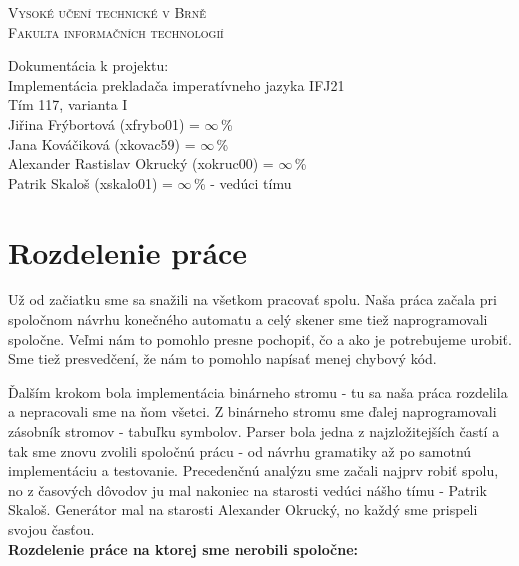 \documentclass[a4paper, 12pt]{article}
\begin{document}
\begin{titlepage}
\begin{center}
\thispagestyle{empty}
{\Huge
\textsc{Vysoké učení technické v Brně\\}}
{\LARGE
\textsc {Fakulta informačních technologií\\[0.4em]}}


{\LARGE Dokumentácia k projektu: \\[0.3em]}
{\LARGE Implementácia prekladača imperatívneho jazyka IFJ21}
{\LARGE \\Tím 117, varianta I\\[0.3em]}
{\Large 
Jiřina Frýbortová (xfrybo01) = $\infty$\,\%  \\ 
Jana Kováčiková (xkovac59) = $\infty$\,\%  \\ 
Alexander Rastislav Okrucký (xokruc00) = $\infty$\,\%  \\ 
Patrik Skaloš (xskalo01) = $\infty$\,\% - vedúci tímu\\}
\end{center}

\end{titlepage}

\section{Rozdelenie práce}
Už od začiatku sme sa snažili na všetkom pracovať spolu. Naša práca začala pri spoločnom návrhu konečného automatu a celý skener sme tiež naprogramovali spoločne. Veľmi nám to pomohlo presne pochopiť, čo a ako je potrebujeme urobiť. Sme tiež presvedčení, že nám to pomohlo napísať menej chybový kód.

Ďalším krokom bola implementácia binárneho stromu - tu sa naša práca rozdelila a nepracovali sme na ňom všetci. Z binárneho stromu sme ďalej naprogramovali zásobník stromov - tabuľku symbolov. Parser bola jedna z najzložitejších častí a tak sme znovu zvolili spoločnú prácu - od návrhu gramatiky až po samotnú implementáciu a testovanie. Precedenčnú analýzu sme začali najprv robiť spolu, no z časových dôvodov ju mal nakoniec na starosti vedúci nášho tímu - Patrik Skaloš. Generátor mal na starosti Alexander Okrucký, no každý sme prispeli svojou časťou.\\

\noindent\textbf{Rozdelenie práce na ktorej sme nerobili spoločne:\\}
\end{document}
